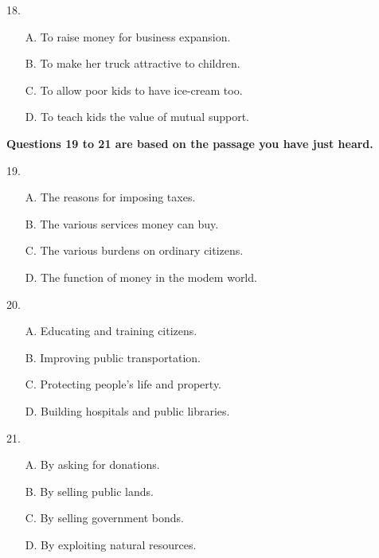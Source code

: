 \documentclass[UTF8,11pt]{ctexart}
\begin{document}
18.


\begin{itemize}[leftmargin=2em,itemsep=.2em,topsep=.4em]\item[A.] To raise money for business expansion.
\item[B.] To make her truck attractive to children.
\end{itemize}

\begin{itemize}[leftmargin=2em,itemsep=.2em,topsep=.4em]\item[C.] To allow poor kids to have ice-cream too.
\item[D.] To teach kids the value of mutual support.
\end{itemize}

\textbf{Questions 19 to 21 are based on the passage you have just heard.}


19.


\begin{itemize}[leftmargin=2em,itemsep=.2em,topsep=.4em]\item[A.] The reasons for imposing taxes.
\item[B.] The various services money can buy.
\item[C.] The various burdens on ordinary citizens.
\item[D.] The function of money in the modem world.
\end{itemize}

20.


\begin{itemize}[leftmargin=2em,itemsep=.2em,topsep=.4em]\item[A.] Educating and training citizens.
\item[B.] Improving public transportation.
\item[C.] Protecting people's life and property.
\item[D.] Building hospitals and public libraries.
\end{itemize}

21.


\begin{itemize}[leftmargin=2em,itemsep=.2em,topsep=.4em]\item[A.] By asking for donations.
\item[B.] By selling public lands.
\item[C.] By selling government bonds.
\item[D.] By exploiting natural resources.
\end{itemize}
\end{document}
